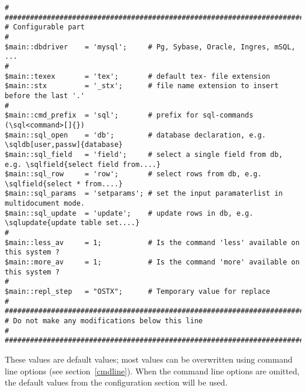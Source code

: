 \documentclass{article}
\newcommand{\vs}{\vspace{3mm}}
\begin{document}
{\scriptsize\begin{verbatim}
#
################################################################################
# Configurable part
#
$main::dbdriver    = 'mysql';     # Pg, Sybase, Oracle, Ingres, mSQL, ...
#
$main::texex       = 'tex';       # default tex- file extension
$main::stx         = '_stx';      # file name extension to insert before the last '.'
#
$main::cmd_prefix  = 'sql';       # prefix for sql-commands (\sql<command>[]{})
$main::sql_open    = 'db';        # database declaration, e.g. \sqldb[user,passw]{database}
$main::sql_field   = 'field';     # select a single field from db, e.g. \sqlfield{select field from....}
$main::sql_row     = 'row';       # select rows from db, e.g. \sqlfield{select * from....}
$main::sql_params  = 'setparams'; # set the input paramaterlist in multidocument mode.
$main::sql_update  = 'update';    # update rows in db, e.g. \sqlupdate{update table set....}
#
$main::less_av     = 1;           # Is the command 'less' available on this system ?
$main::more_av     = 1;           # Is the command 'more' available on this system ?
#
$main::repl_step   = "OSTX";      # Temporary value for replace
#
################################################################################
# Do not make any modifications below this line                                #
################################################################################
\end{verbatim}}

\vs

These values are default values; most values can be overwritten using command line
options (see section~\ref{cmdline}). When the command line options are
omitted, the default values from the configuration section will be used.
\end{document}
